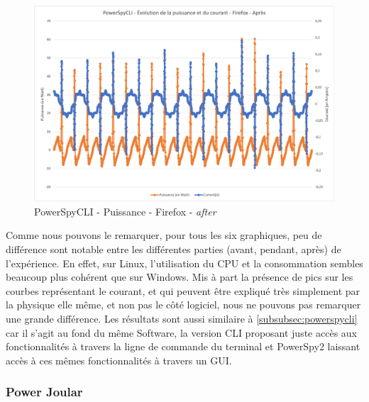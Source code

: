 \documentclass[12pt, a4paper]{report}
\begin{document}
\begin{figure}[H]
    \includegraphics[width=1\linewidth]{res//graph/PowerSpyCLI/Puissance_ff_apres.png}
    \caption{PowerSpyCLI - Puissance - Firefox - \textit{after}}
    \label{fig:pscli_power_ff_after}
\end{figure}


Comme nous pouvons le remarquer, pour tous les six graphiques, peu de différence sont notable entre les différentes parties (avant, pendant, après) de l'expérience. En effet, sur Linux, l'utilisation du CPU et la consommation sembles beaucoup plus cohérent que sur Windows. Mis à part la présence de pics sur les courbes représentant le courant, et qui peuvent être expliqué très simplement par la physique elle même, et non pas le côté logiciel, nous ne pouvons pas remarquer une grande différence.
Les résultats sont aussi similaire à \ref{subsubsec:powerspycli} car il s'agit au fond du même Software, la version CLI proposant juste accès aux fonctionnalités à travers la ligne de commande du terminal et PowerSpy2 laissant accès à ces mêmes fonctionnalités à travers un GUI.

\subsubsection{Power Joular}
\end{document}
